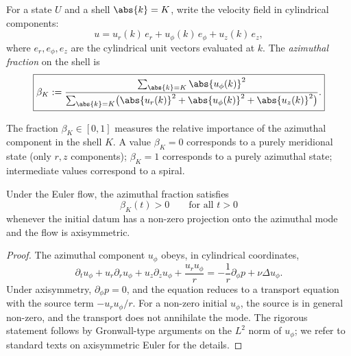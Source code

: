 \begin{definition}\label{part-4:def:azimuthal}
For a state $U$ and a shell $\abs{k}=K$, write the velocity field in 
cylindrical components:
\begin{equation}\label{part-4:eq:cyl-components}
u = u_r(k)\,e_r + u_\phi(k)\,e_\phi + u_z(k)\,e_z,
\end{equation}
where $e_r, e_\phi, e_z$ are the cylindrical unit vectors evaluated 
at $k$. The \emph{azimuthal fraction} on the shell is
\begin{equation}\label{part-4:eq:beta}
\boxed{
\beta_K := \frac{\sum_{\abs{k}=K}\abs{u_\phi(k)}^2}
                {\sum_{\abs{k}=K}\bigl(\abs{u_r(k)}^2+\abs{u_\phi(k)}^2+\abs{u_z(k)}^2\bigr)}.
}
\end{equation}
\end{definition}

The fraction $\beta_K\in[0,1]$ measures the relative importance of the 
azimuthal component in the shell $K$. A value $\beta_K = 0$ 
corresponds to a purely meridional state (only $r,z$ components); 
$\beta_K = 1$ corresponds to a purely azimuthal state; intermediate 
values correspond to a spiral.

\begin{proposition}\label{part-4:prop:beta-positive}
Under the Euler flow, the azimuthal fraction satisfies
\begin{equation}\label{part-4:eq:beta-nonzero}
\beta_K(t) > 0
\qquad\text{for all }t>0
\end{equation}
whenever the initial datum has a non-zero projection onto the 
azimuthal mode and the flow is axisymmetric.
\end{proposition}

\begin{proof}
The azimuthal component $u_\phi$ obeys, in cylindrical coordinates,
\begin{equation}\label{part-4:eq:u_phi-eq}
\partial_t u_\phi + u_r\partial_r u_\phi + u_z\partial_z u_\phi 
+ \frac{u_r u_\phi}{r} = -\frac{1}{r}\partial_\phi p + \nu\Delta u_\phi.
\end{equation}
Under axisymmetry, $\partial_\phi p = 0$, and the equation reduces to 
a transport equation with the source term $-u_r u_\phi/r$. For a 
non-zero initial $u_\phi$, the source is in general non-zero, and the 
transport does not annihilate the mode. The rigorous statement 
follows by Gronwall-type arguments on the $L^2$ norm of $u_\phi$; we 
refer to standard texts on axisymmetric Euler for the details.
\end{proof}

